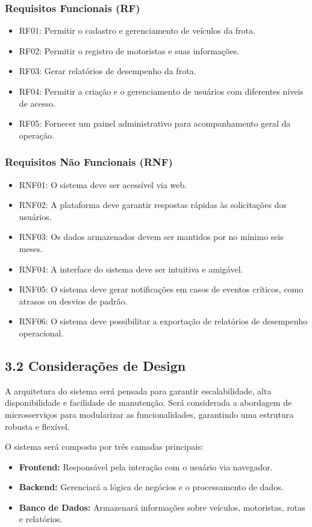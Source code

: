 \documentclass[12pt]{article}
\begin{document}
\subsubsection*{Requisitos Funcionais (RF)}
\begin{itemize}
\item RF01: Permitir o cadastro e gerenciamento de veículos da frota.
\item RF02: Permitir o registro de motoristas e suas informações.
\item RF03: Gerar relatórios de desempenho da frota.
\item RF04: Permitir a criação e o gerenciamento de usuários com diferentes níveis de acesso.
\item RF05: Fornecer um painel administrativo para acompanhamento geral da operação.
\end{itemize}

\subsubsection*{Requisitos Não Funcionais (RNF)}
\begin{itemize}
\item RNF01: O sistema deve ser acessível via web.
\item RNF02: A plataforma deve garantir respostas rápidas às solicitações dos usuários.
\item RNF03: Os dados armazenados devem ser mantidos por no mínimo seis meses.
\item RNF04: A interface do sistema deve ser intuitiva e amigável.
\item RNF05: O sistema deve gerar notificações em casos de eventos críticos, como atrasos ou desvios de padrão.
\item RNF06: O sistema deve possibilitar a exportação de relatórios de desempenho operacional.
\end{itemize}

\subsection*{3.2 Considerações de Design}
A arquitetura do sistema será pensada para garantir escalabilidade, alta disponibilidade e facilidade de manutenção. Será considerada a abordagem de microsserviços para modularizar as funcionalidades, garantindo uma estrutura robusta e flexível.

O sistema será composto por três camadas principais:
\begin{itemize}
\item \textbf{Frontend:} Responsável pela interação com o usuário via navegador.
\item \textbf{Backend:} Gerenciará a lógica de negócios e o processamento de dados.
\item \textbf{Banco de Dados:} Armazenará informações sobre veículos, motoristas, rotas e relatórios.
\end{itemize}
\end{document}

